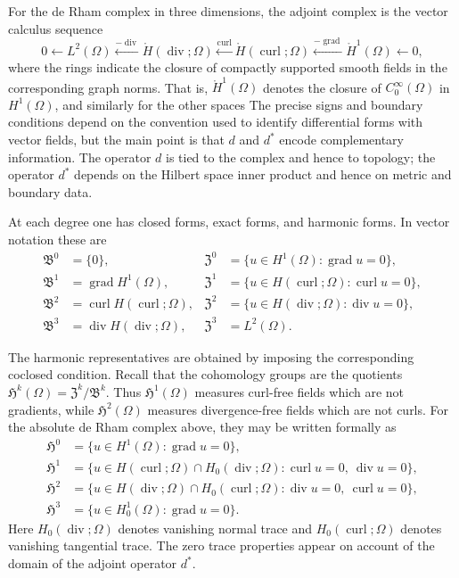 \documentclass{article}
\DeclareMathOperator{\grad}{grad}
\DeclareMathOperator{\curl}{curl}
\DeclareMathOperator{\divergence}{div}
\newcommand{\f}[1]{\mathfrak{#1}}
\begin{document}
For the de Rham complex in three dimensions, the adjoint complex is the vector
calculus sequence
\begin{equation}\label{eq:adjoint-vector-derham}
	0
	\longleftarrow
	L^2(\Omega)
	\xleftarrow{-\divergence}
	\mathring H(\divergence;\Omega)
	\xleftarrow{\curl}
	\mathring H(\curl;\Omega)
	\xleftarrow{-\grad}
	\mathring H^1(\Omega)
	\longleftarrow
	0,
\end{equation}
where the rings indicate the closure of compactly supported smooth fields in the
corresponding graph norms. That is, $\mathring{H}^1(\Omega)$ denotes the closure of $C^{\infty}_0(\Omega)$ in $H^1(\Omega)$, and similarly for the other spaces The precise signs and boundary conditions depend on
the convention used to identify differential forms with vector fields, but the
main point is that $d$ and $d^*$ encode complementary information.  The operator
$d$ is tied to the complex and hence to topology; the operator $d^*$ depends on
the Hilbert space inner product and hence on metric and boundary data.






At each degree one has closed forms, exact forms, and harmonic forms.  In vector
notation these are
\begin{align*}
	\f B^0 &= \{0\},
&
	\f Z^0 &= \{u\in H^1(\Omega):\grad u=0\},\\
	\f B^1 &= \grad H^1(\Omega),
&
	\f Z^1 &= \{u\in H(\curl;\Omega):\curl u=0\},\\
	\f B^2 &= \curl H(\curl;\Omega),
&
	\f Z^2 &= \{u\in H(\divergence;\Omega):\divergence u=0\},\\
	\f B^3 &= \divergence H(\divergence;\Omega),
&
	\f Z^3 &= L^2(\Omega).
\end{align*}



The harmonic representatives are obtained by imposing the corresponding
coclosed condition. Recall that the cohomology groups are the quotients $\f H^k(\Omega)=\f Z^k/\f B^k$. Thus $\f H^1(\Omega)$ measures curl-free fields which are not gradients, while
$\f H^2(\Omega)$ measures divergence-free fields which are not curls.
 For the absolute de Rham complex above, they may be written
formally as
\begin{align*}
	\f H^0
	&=
	\{u\in H^1(\Omega): \grad u=0\},\\
	\f H^1
	&=
	\{u\in H(\curl;\Omega)\cap H_0(\divergence;\Omega):
		\curl u=0,\ \divergence u=0\},\\
	\f H^2
	&=
	\{u\in H(\divergence;\Omega)\cap H_0(\curl;\Omega):
		\divergence u=0,\ \curl u=0\},\\
	\f H^3
	&=
	\{u\in H^1_0(\Omega): \grad u=0\}.
\end{align*}
Here $H_0(\divergence;\Omega)$ denotes vanishing normal trace and
$H_0(\curl;\Omega)$ denotes vanishing tangential trace. The zero trace properties appear on account of the domain of the adjoint operator $d^*$. 
\end{document}
